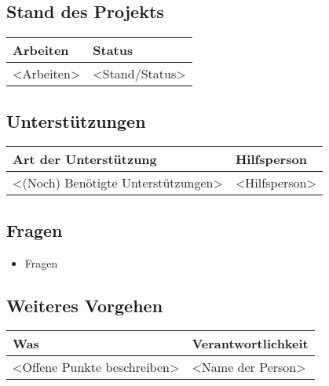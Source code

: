 \clearpage


\subsection*{Stand des Projekts}
\begin{table}[H]
    \centering
    \begin{tabular}{p{12cm} p{4cm}}
        \textbf{Arbeiten} & \textbf{Status} \\ \hline
        <Arbeiten> & <Stand/Status> \\ \hline
    \end{tabular}
\end{table}

\vspace{1cm}

\subsection*{Unterstützungen}
\begin{table}[H]
    \centering
    \begin{tabular}{p{12cm} p{4cm}}
        \textbf{Art der Unterstützung} & \textbf{Hilfsperson} \\ \hline
        <(Noch) Benötigte Unterstützungen> & <Hilfsperson> \\ \hline
    \end{tabular}
\end{table}

\vspace{1cm}

\subsection*{Fragen}
\begin{itemize}
    \item Fragen
\end{itemize}

\vspace{1cm}

\subsection*{Weiteres Vorgehen}
\begin{table}[H]
    \centering
    \begin{tabular}{p{12cm} p{4cm}}
        \textbf{Was} & \textbf{Verantwortlichkeit} \\ \hline
        <Offene Punkte beschreiben> & <Name der Person> \\ \hline
    \end{tabular}
\end{table}

